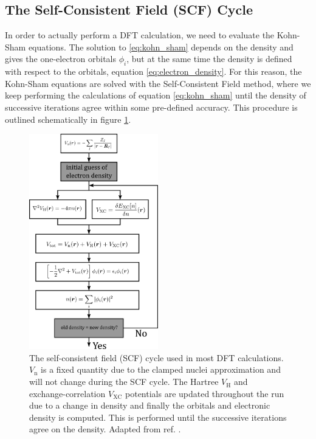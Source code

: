 \subsection{The Self-Consistent Field (SCF) Cycle}
In order to actually perform a DFT calculation, we need to evaluate the Kohn-Sham equations. The solution to \eqref{eq:kohn_sham} depends on the density and gives the one-electron orbitals $\phi_i$, but at the same time the density is defined with respect to the orbitals, equation \eqref{eq:electron_density}. For this reason, the Kohn-Sham equations are solved with the Self-Consistent Field method, where we keep performing the calculations of equation \eqref{eq:kohn_sham} until the density of successive iterations agree within some pre-defined accuracy. This procedure is outlined schematically in figure \ref{fig:scf}.

\begin{figure}
	\centering
	\includegraphics[width=0.5\textwidth]{fig/method/dft/scf_cycle.png}
	\caption{The self-consistent field (SCF) cycle used in most DFT calculations. $V_\text{n}$ is a fixed quantity due to the clamped nuclei approximation and will not change during the SCF cycle. The Hartree $V_\text{H}$ and exchange-correlation $V_\text{XC}$ potentials are updated throughout the run due to a change in density and finally the orbitals and electronic density is computed. This is performed until the successive iterations agree on the density. Adapted from ref. \cite{Giustino2014}.}
	\label{fig:scf}
\end{figure}

